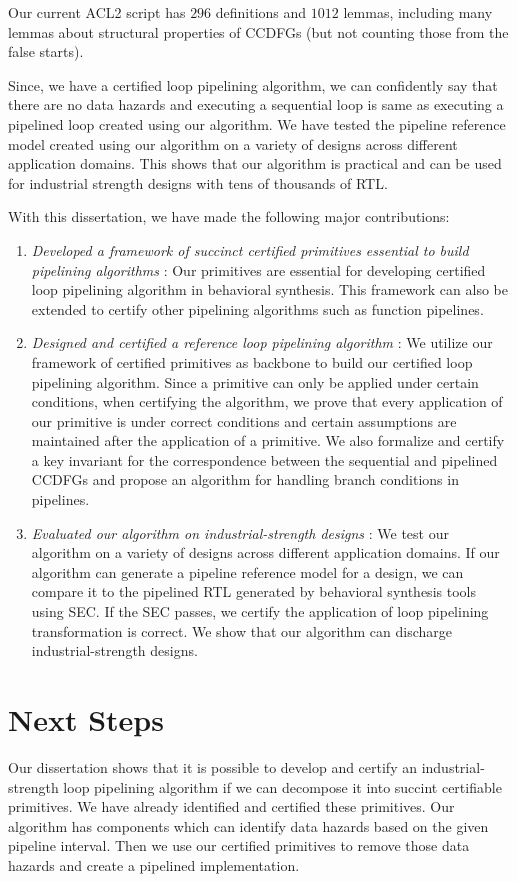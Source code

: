 Our current ACL2 script has $296$ definitions and $1012$ lemmas, including many lemmas about structural properties of CCDFGs (but not counting those from the false starts). 

Since, we have a certified loop pipelining algorithm, we can confidently say that there are no data hazards and executing a sequential loop is same as executing a pipelined loop created using our algorithm. We have tested the pipeline reference model created using our algorithm on a variety of designs across different application domains. This shows that our algorithm is practical and can be used for industrial strength designs with tens of thousands of RTL. 

With this dissertation, we have made the following major contributions:
\begin{enumerate}[--]
\item {\em Developed a framework of succinct certified primitives essential to build pipelining algorithms} : Our primitives are essential for developing certified loop pipelining algorithm in behavioral synthesis. This framework can also be extended to certify other pipelining algorithms such as function pipelines.
\item {\em Designed and certified a reference loop pipelining algorithm} : We utilize our framework of certified primitives as backbone to build our certified loop pipelining algorithm. Since a primitive can only be applied under certain conditions, when certifying the algorithm, we prove that every application of our primitive is under correct conditions and certain assumptions are maintained after the application of a primitive. We also formalize and certify a key invariant for the correspondence between the sequential and pipelined CCDFGs and propose an algorithm for handling branch conditions in pipelines.
\item {\em Evaluated our algorithm on industrial-strength designs} : We test our algorithm on a variety of designs across different application domains. If our algorithm can generate a pipeline reference model for a design, we can compare it to the pipelined RTL generated by behavioral synthesis tools using SEC. If the SEC passes, we certify the application of loop pipelining transformation is correct. We show that our algorithm can discharge industrial-strength designs.
\end{enumerate} 

\section{Next Steps}
Our dissertation shows that it is possible to develop and certify an industrial-strength loop pipelining algorithm if we can decompose it into succint certifiable primitives. We have already identified and certified these primitives. Our algorithm has components which can identify data hazards based on the given pipeline interval. Then we use our certified primitives to remove those data hazards and create a pipelined implementation.

